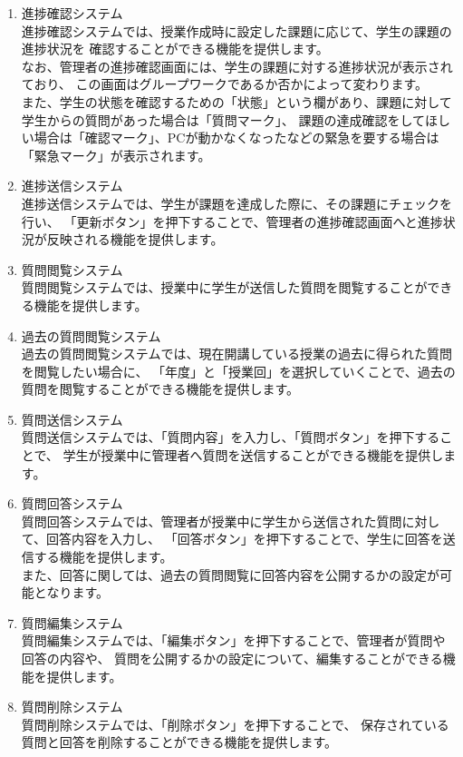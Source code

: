\begin{enumerate}
\item 進捗確認システム\\
進捗確認システムでは、授業作成時に設定した課題に応じて、学生の課題の進捗状況を
確認することができる機能を提供します。\\
なお、管理者の進捗確認画面には、学生の課題に対する進捗状況が表示されており、
この画面はグループワークであるか否かによって変わります。\\
また、学生の状態を確認するための「状態」という欄があり、課題に対して学生からの質問があった場合は「質問マーク」、
課題の達成確認をしてほしい場合は「確認マーク」、PCが動かなくなったなどの緊急を要する場合は「緊急マーク」が表示されます。

\item 進捗送信システム\\
進捗送信システムでは、学生が課題を達成した際に、その課題にチェックを行い、
「更新ボタン」を押下することで、管理者の進捗確認画面へと進捗状況が反映される機能を提供します。

\item 質問閲覧システム\\
質問閲覧システムでは、授業中に学生が送信した質問を閲覧することができる機能を提供します。

\item 過去の質問閲覧システム\\
過去の質問閲覧システムでは、現在開講している授業の過去に得られた質問を閲覧したい場合に、
「年度」と「授業回」を選択していくことで、過去の質問を閲覧することができる機能を提供します。

\item 質問送信システム\\
質問送信システムでは、「質問内容」を入力し、「質問ボタン」を押下することで、
学生が授業中に管理者へ質問を送信することができる機能を提供します。

\item 質問回答システム\\
質問回答システムでは、管理者が授業中に学生から送信された質問に対して、回答内容を入力し、
「回答ボタン」を押下することで、学生に回答を送信する機能を提供します。\\
また、回答に関しては、過去の質問閲覧に回答内容を公開するかの設定が可能となります。

\item 質問編集システム\\
質問編集システムでは、「編集ボタン」を押下することで、管理者が質問や回答の内容や、
質問を公開するかの設定について、編集することができる機能を提供します。

\item 質問削除システム\\
質問削除システムでは、「削除ボタン」を押下することで、
保存されている質問と回答を削除することができる機能を提供します。

\end{enumerate}

